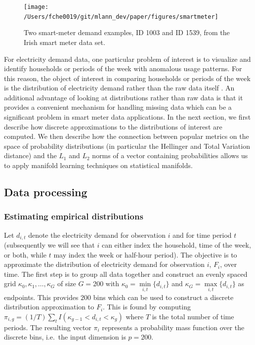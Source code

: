 \documentclass[11pt,a4paper,]{article}
\begin{document}
\begin{figure}

{\centering \texttt{[image: /Users/fche0019/git/mlann\_dev/paper/figures/smartmeter]} 

}

\caption{Two smart-meter demand examples, ID 1003 and ID 1539, from the Irish smart meter data set.}\label{fig:smartmeter}
\end{figure}

For electricity demand data, one particular problem of interest is to visualize and identify households or periods of the week with anomalous usage patterns. For this reason, the object of interest in comparing households or periods of the week is the distribution of electricity demand rather than the raw data itself \autocite{Hyndman2018-ia}. An additional advantage of looking at distributions rather than raw data is that it provides a convenient mechanism for handling missing data which can be a significant problem in smart meter data applications. In the next section, we first describe how discrete approximations to the distributions of interest are computed. We then describe how the connection between popular metrics on the space of probability distributions (in particular the Hellinger and Total Variation distance) and the \(L_1\) and \(L_2\) norms of a vector containing probabilities allows us to apply manifold learning techniques on statistical manifolds.

\hypertarget{dataprocessing}{%
\subsection{Data processing}\label{dataprocessing}}

\hypertarget{estimating-empirical-distributions}{%
\subsubsection*{Estimating empirical distributions}\label{estimating-empirical-distributions}}

Let \(d_{i,t}\) denote the electricity demand for observation \(i\) and for time period \(t\) (subsequently we will see that \(i\) can either index the household, time of the week, or both, while \(t\) may index the week or half-hour period). The objective is to approximate the distribution of electricity demand for observation \(i\), \(F_i\), over time. The first step is to group all data together and construct an evenly spaced grid \(\kappa_0,\kappa_1,\dots,\kappa_G\) of size \(G=200\) with \(\kappa_0=\underset{i,t}{\min} \{d_{i,t}\}\) and \(\kappa_G=\underset{i,t}{\max} \{d_{i,t}\}\) as endpoints. This provides \(200\) bins which can be used to construct a discrete distribution approximation to \(F_i\). This is found by computing \(\pi_{i,g}=(1/T)\sum_t I(\kappa_{g-1}<d_{i,t}<\kappa_g)\) where \(T\) is the total number of time periods. The resulting vector \(\pi_i\) represents a probability mass function over the discrete bins, i.e.~the input dimension is \(p=200\).
\end{document}
